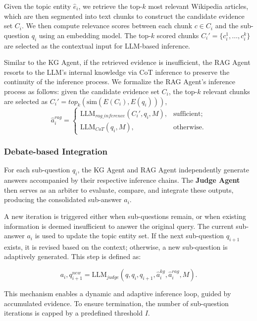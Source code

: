 Given the topic entity $\hat{e}_i$, we retrieve the top-$k$ most relevant Wikipedia articles, which are then segmented into text chunks to construct the candidate evidence set $C_i$. We then compute relevance scores between each chunk $c \in C_i$ and the sub-question $q_i$ using an embedding model. The top-$k$ scored chunks $C_i' = \{c_i^1, \dots, c_i^k\}$ are selected as the contextual input for LLM-based inference.

Similar to the KG Agent, if the retrieved evidence is insufficient, the RAG Agent resorts to the LLM's internal knowledge via CoT inference to preserve the continuity of the inference process.
We formalize the RAG Agent’s inference process as follows: given the candidate evidence set $C_i$, the top-$k$ relevant chunks are selected as $C_i' = top_k(\text{sim}(E(C_i), E(q_i)))$, 
\begin{equation}
\hat{a}_i^{rag}=
\begin{cases}
\text{LLM}_{rag\_inference}(C_i',q_i, M), & \text{sufficient;} \\
\text{LLM}_{CoT}(q_i, M), & \text{otherwise.}
\end{cases}
\end{equation}
\subsubsection{Debate-based Integration}
For each sub-question $q_i$, the KG Agent and RAG Agent independently generate answers accompanied by their respective inference chains. The \textbf{Judge Agent} then serves as an arbiter to evaluate, compare, and integrate these outputs, producing the consolidated sub-answer $a_i$.

A new iteration is triggered either when sub-questions remain, or when existing information is deemed insufficient to answer the original query. The current sub-answer $a_i$ is used to update the topic entity set. If the next sub-question $q_{i+1}$ exists, it is revised based on the context; otherwise, a new sub-question is adaptively generated. This step is defined as:

\begin{equation}
a_i,q_{i+1}^{new} = \text{LLM}_{judge}(q,q_i,q_{i+1},\hat{a}_i^{kg}, \hat{a}_i^{rag}, M).
\end{equation}

This mechanism enables a dynamic and adaptive inference loop, guided by accumulated evidence. To ensure termination, the number of sub-question iterations is capped by a predefined threshold $I$.


